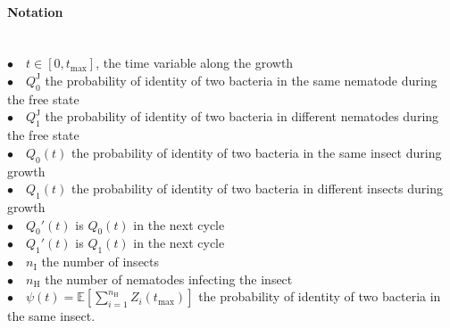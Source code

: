 \documentclass{article}
\newcommand{\nN}{{n_\textrm{H}}}
\newcommand{\nI}{{n_\textrm{I}}}
\begin{document}
 \paragraph{Notation} $ $\\
 $\bullet \quad t \in [0, t_{\mathrm{max}}]$, the time variable along the growth\\
 $\bullet \quad Q_0^{\mathrm{J}}$ the probability of identity of two bacteria in the same nematode during the free state\\
 $\bullet \quad Q_1^{\mathrm{J}}$ the probability of identity of two bacteria in different nematodes during the free state\\
 $\bullet \quad Q_0(t)$ the probability of identity of two bacteria in the same insect during growth\\
 $\bullet \quad Q_1(t)$ the probability of identity of two bacteria in different insects during growth\\
 $\bullet \quad Q_0'(t)$ is $Q_0(t)$ in the next cycle\\
 $\bullet \quad Q_1'(t)$ is $Q_1(t)$ in the next cycle\\
 $\bullet \quad \nI$ the number of insects\\
 $\bullet \quad \nN $ the number of nematodes infecting the insect\\
 $\bullet \quad \psi(t)={\mathbb E} \left[ \displaystyle  \sum_{i=1}^\nN  Z_i (t_{\mathrm{max}}) \right]$ the probability of identity of two bacteria in the same insect.
 
\end{document}
